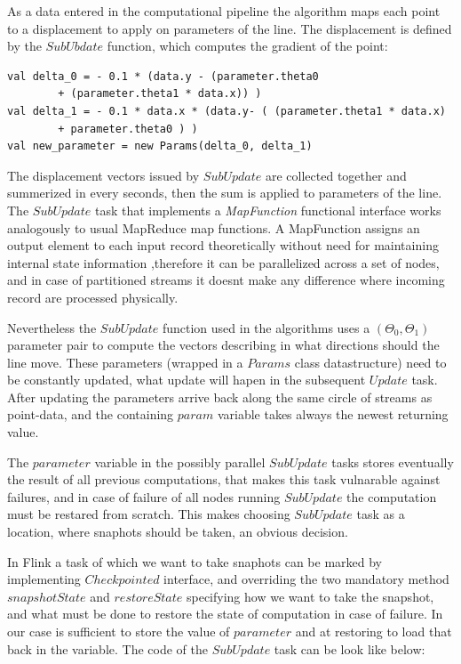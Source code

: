 As a data entered in the computational pipeline the algorithm maps	 each point to a displacement to apply on parameters of the line. The displacement is defined by the $SubUbdate$ function, which computes the gradient of the point:
\begin{lstlisting}
val delta_0 = - 0.1 * (data.y - (parameter.theta0 
		+ (parameter.theta1 * data.x)) )
val delta_1 = - 0.1 * data.x * (data.y- ( (parameter.theta1 * data.x) 
		+ parameter.theta0 ) )
val new_parameter = new Params(delta_0, delta_1)
\end{lstlisting}
The displacement vectors issued by $SubUpdate$ are collected together and summerized in every seconds, then the sum is applied to parameters of the line. 
The $SubUpdate$ task that implements a \textit{MapFunction} functional interface works analogously to usual MapReduce map functions. A MapFunction assigns an output element to each input record theoretically without need for maintaining internal state information ,therefore it can be parallelized across a set of nodes, and in case of partitioned streams it doesnt make any difference where incoming record are processed physically.

Nevertheless the $SubUpdate$ function used in the algorithms uses a $(\Theta_0,\Theta_1)$ parameter pair to compute the vectors describing in what directions should the line move. These parameters (wrapped in a $Params$ class datastructure) need to be constantly updated, what update will hapen in the subsequent $Update$ task. After updating the parameters arrive back along the same circle of streams as point-data, and the containing $param$ variable takes always the newest returning value.    

The $parameter$ variable in the possibly parallel $SubUpdate$ tasks stores eventually the result of all previous computations, that makes this task vulnarable against failures, and in case of failure of all nodes running $SubUpdate$ the computation must be restared from scratch. This makes choosing $SubUpdate$ task as a location, where snaphots should be taken, an obvious decision.  

In Flink a task of which we want to take snaphots can be marked by implementing $Checkpointed$ interface, and overriding the two mandatory method $snapshotState$ and $restoreState$ specifying how we want to take the snapshot, and what must be done to restore the state of computation in case of failure. In our case is sufficient to store the value of $parameter$ and at restoring to load that back in the variable. The code of the $SubUpdate$ task can be look like below:

